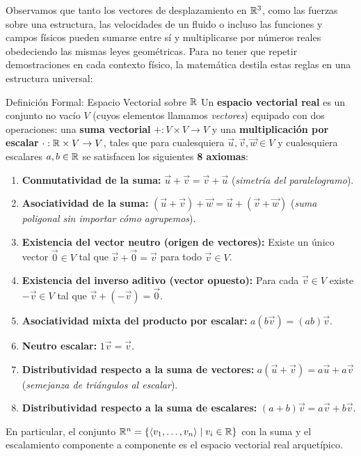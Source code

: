 \documentclass[11pt,letterpaper]{article}
\begin{document}
Observamos que tanto los vectores de desplazamiento en $\mathbb{R}^3$, como las fuerzas sobre una estructura, las velocidades de un fluido o incluso las funciones y campos físicos pueden sumarse entre sí y multiplicarse por números reales obedeciendo las mismas leyes geométricas. Para no tener que repetir demostraciones en cada contexto físico, la matemática destila estas reglas en una estructura universal:

\begin{theorembox}{Definición Formal: Espacio Vectorial sobre $\mathbb{R}$}
Un \textbf{espacio vectorial real} es un conjunto no vacío $V$ (cuyos elementos llamamos \emph{vectores}) equipado con dos operaciones: una \textbf{suma vectorial} $+: V \times V \to V$ y una \textbf{multiplicación por escalar} $\cdot: \mathbb{R} \times V \to V$, tales que para cualesquiera $\vec{u}, \vec{v}, \vec{w} \in V$ y cualesquiera escalares $a, b \in \mathbb{R}$ se satisfacen los siguientes \textbf{8 axiomas}:
\begin{enumerate}
    \item \textbf{Conmutatividad de la suma:} $\vec{u} + \vec{v} = \vec{v} + \vec{u}$ \quad (\emph{simetría del paralelogramo}).
    \item \textbf{Asociatividad de la suma:} $(\vec{u} + \vec{v}) + \vec{w} = \vec{u} + (\vec{v} + \vec{w})$ \quad (\emph{suma poligonal sin importar cómo agrupemos}).
    \item \textbf{Existencia del vector neutro (origen de vectores):} Existe un único vector $\vec{0} \in V$ tal que $\vec{v} + \vec{0} = \vec{v}$ para todo $\vec{v} \in V$.
    \item \textbf{Existencia del inverso aditivo (vector opuesto):} Para cada $\vec{v} \in V$ existe $-\vec{v} \in V$ tal que $\vec{v} + (-\vec{v}) = \vec{0}$.
    \item \textbf{Asociatividad mixta del producto por escalar:} $a(b\vec{v}) = (ab)\vec{v}$.
    \item \textbf{Neutro escalar:} $1\vec{v} = \vec{v}$.
    \item \textbf{Distributividad respecto a la suma de vectores:} $a(\vec{u} + \vec{v}) = a\vec{u} + a\vec{v}$ \quad (\emph{semejanza de triángulos al escalar}).
    \item \textbf{Distributividad respecto a la suma de escalares:} $(a + b)\vec{v} = a\vec{v} + b\vec{v}$.
\end{enumerate}
En particular, el conjunto $\mathbb{R}^n = \{\langle v_1, \dots, v_n \rangle \mid v_i \in \mathbb{R}\}$ con la suma y el escalamiento componente a componente es el espacio vectorial real arquetípico.
\end{theorembox}
\end{document}
